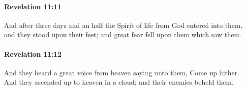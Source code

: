 		\paragraph{Revelation 11:11} %
			\label{REVELATIONNT-11-11}

			And after three days and an half the Spirit of life from God entered into them, and they stood upon their feet; and great fear fell upon them which saw them.

			\begin{framed}
			\scriptsize
				\begin{compactdesc}
					\item[SBLG] 
				\end{compactdesc}
			\end{framed}

		\paragraph{Revelation 11:12} %
			\label{REVELATIONNT-11-12}

			And they heard a great voice from heaven saying unto them, Come up hither. And they ascended up to heaven in a cloud; and their enemies beheld them.

